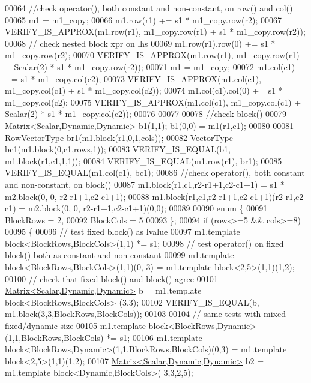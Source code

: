 \begin{DoxyCode}
00064   \textcolor{comment}{//check operator(), both constant and non-constant, on row() and col()}
00065   m1 = m1\_copy;
00066   m1.row(r1) += s1 * m1\_copy.row(r2);
00067   VERIFY\_IS\_APPROX(m1.row(r1), m1\_copy.row(r1) + s1 * m1\_copy.row(r2));
00068   \textcolor{comment}{// check nested block xpr on lhs}
00069   m1.row(r1).row(0) += s1 * m1\_copy.row(r2);
00070   VERIFY\_IS\_APPROX(m1.row(r1), m1\_copy.row(r1) + Scalar(2) * s1 * m1\_copy.row(r2));
00071   m1 = m1\_copy;
00072   m1.col(c1) += s1 * m1\_copy.col(c2);
00073   VERIFY\_IS\_APPROX(m1.col(c1), m1\_copy.col(c1) + s1 * m1\_copy.col(c2));
00074   m1.col(c1).col(0) += s1 * m1\_copy.col(c2);
00075   VERIFY\_IS\_APPROX(m1.col(c1), m1\_copy.col(c1) + Scalar(2) * s1 * m1\_copy.col(c2));
00076   
00077   
00078   \textcolor{comment}{//check block()}
00079   \hyperlink{group___core___module}{Matrix<Scalar,Dynamic,Dynamic>} b1(1,1); b1(0,0) = m1(r1,c1);
00080 
00081   RowVectorType br1(m1.block(r1,0,1,cols));
00082   VectorType bc1(m1.block(0,c1,rows,1));
00083   VERIFY\_IS\_EQUAL(b1, m1.block(r1,c1,1,1));
00084   VERIFY\_IS\_EQUAL(m1.row(r1), br1);
00085   VERIFY\_IS\_EQUAL(m1.col(c1), bc1);
00086   \textcolor{comment}{//check operator(), both constant and non-constant, on block()}
00087   m1.block(r1,c1,r2-r1+1,c2-c1+1) = s1 * m2.block(0, 0, r2-r1+1,c2-c1+1);
00088   m1.block(r1,c1,r2-r1+1,c2-c1+1)(r2-r1,c2-c1) = m2.block(0, 0, r2-r1+1,c2-c1+1)(0,0);
00089 
00090   \textcolor{keyword}{enum} \{
00091     BlockRows = 2,
00092     BlockCols = 5
00093   \};
00094   \textcolor{keywordflow}{if} (rows>=5 && cols>=8)
00095   \{
00096     \textcolor{comment}{// test fixed block() as lvalue}
00097     m1.template block<BlockRows,BlockCols>(1,1) *= s1;
00098     \textcolor{comment}{// test operator() on fixed block() both as constant and non-constant}
00099     m1.template block<BlockRows,BlockCols>(1,1)(0, 3) = m1.template block<2,5>(1,1)(1,2);
00100     \textcolor{comment}{// check that fixed block() and block() agree}
00101     \hyperlink{group___core___module}{Matrix<Scalar,Dynamic,Dynamic>} b = m1.template block<BlockRows,BlockCols>
      (3,3);
00102     VERIFY\_IS\_EQUAL(b, m1.block(3,3,BlockRows,BlockCols));
00103 
00104     \textcolor{comment}{// same tests with mixed fixed/dynamic size}
00105     m1.template block<BlockRows,Dynamic>(1,1,BlockRows,BlockCols) *= s1;
00106     m1.template block<BlockRows,Dynamic>(1,1,BlockRows,BlockCols)(0,3) = m1.template block<2,5>(1,1)(1,2);
00107     \hyperlink{group___core___module}{Matrix<Scalar,Dynamic,Dynamic>} b2 = m1.template block<Dynamic,BlockCols>(
      3,3,2,5);

\end{DoxyCode}
